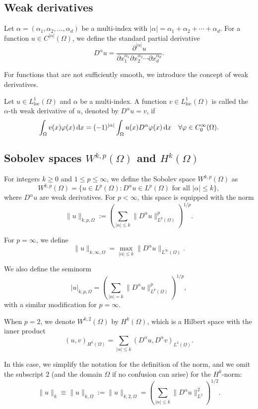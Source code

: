 \subsection{Weak derivatives}

Let $\alpha = (\alpha_1, \alpha_2, \ldots, \alpha_d)$ be a multi-index with $|\alpha| = \alpha_1 + \alpha_2 + \cdots + \alpha_d$. For a function $u \in C^{|\alpha|}(\Omega)$, we define the standard partial derivative
\[
D^\alpha u = \frac{\partial^{|\alpha|} u}{\partial x_1^{\alpha_1} \partial x_2^{\alpha_2} \cdots \partial x_d^{\alpha_d}}.
\]

For functions that are not sufficiently smooth, we introduce the concept of weak derivatives.

\begin{definition}
Let $u \in L^1_{\text{loc}}(\Omega)$ and $\alpha$ be a multi-index. A function $v \in L^1_{\text{loc}}(\Omega)$ is called the $\alpha$-th weak derivative of $u$, denoted by $D^\alpha u = v$, if
\[
  \int_\Omega v(x) \varphi(x) \mathop{}\!\mathrm{d} x =  (-1)^{|\alpha|} \int_\Omega u(x) D^\alpha \varphi(x) \mathop{}\!\mathrm{d} x  \quad \forall \varphi \in C_0^\infty(\Omega).
\]
\end{definition}

\subsection{Sobolev spaces $W^{k,p}(\Omega)$ and $H^k(\Omega)$}

For integers $k \geq 0$ and $1 \leq p \leq \infty$, we define the Sobolev space $W^{k,p}(\Omega)$ as
\[
W^{k,p}(\Omega) = \{u \in L^p(\Omega) : D^\alpha u \in L^p(\Omega) \text{ for all } |\alpha| \leq k\},
\]
where $D^\alpha u$ are weak derivatives. For $p < \infty$, this space is equipped with the norm
\[
\|u\|_{k,p,\Omega} := \left( \sum_{|\alpha| \leq k} \|D^\alpha u\|_{L^p(\Omega)}^p \right)^{1/p}.
\]

For $p = \infty$, we define
\[
\|u\|_{k,\infty,\Omega} = \max_{|\alpha| \leq k} \|D^\alpha u\|_{L^\infty(\Omega)}.
\]

We also define the seminorm
\[
|u|_{k,p,\Omega} = \left( \sum_{|\alpha| = k} \|D^\alpha u\|_{L^p(\Omega)}^p \right)^{1/p},
\]
with a similar modification for $p = \infty$.

When $p = 2$, we denote $W^{k,2}(\Omega)$ by $H^k(\Omega)$, which is a Hilbert space with the inner product
\[
(u, v)_{H^k(\Omega)} = \sum_{|\alpha| \leq k} (D^\alpha u, D^\alpha v)_{L^2(\Omega)}.
\]

In this case, we simplify the notation for the definition of the norm, and we omit the subscript $2$ (and the domain $\Omega$ if no confusion can arise) for the $H^k$-norm:
\[
  \|u\|_{k} \equiv \|u\|_{k,\Omega} := \|u\|_{k,2,\Omega} = \left( \sum_{|\alpha| \leq k} \|D^\alpha u\|_{L^2}^2 \right)^{1/2}.
\]

